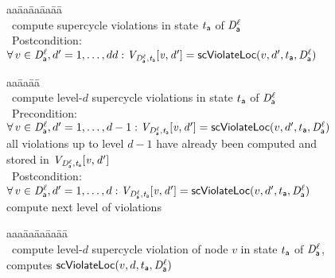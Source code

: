 \begin{figure}[ht]
\setcounter{lctr}{0}
\begin{tabbing}\label{alg:compute-scViol}
aa\= aa\= aa\= aa\= aa\=\kill
{}\\
\cmnt\ compute supercycle violations in state $t_{\mathsf{a}}$ of $\mathit{D}_{\mathsf{a}}^{\ell}$\\
\cmnt\ Postcondition: $\forall\, v \in \mathit{D}_{\mathsf{a}}^{\ell}, d' = 1,\ldots,dd: \mathit{V_{\mathit{D}_{\mathsf{a}}^{\ell},t_{\mathsf{a}}} [v,d']} = \mathsf{scViolateLoc}(v,d',t_{\mathsf{a}},\mathit{D}_{\mathsf{a}}^{\ell})$\\
\end{tabbing}

\setcounter{lctr}{0}
\begin{tabbing}\label{alg:compute-scViolDist}
aa\= aa\= aa\= \kill
{}\\
\cmnt\ compute level-$d$ supercycle violations in state $t_{\mathsf{a}}$ of $\mathit{D}_{\mathsf{a}}^{\ell}$\\
\cmnt\ Precondition: $\forall\, v \in \mathit{D}_{\mathsf{a}}^{\ell}, d' = 1,\ldots,d-1: \mathit{V_{\mathit{D}_{\mathsf{a}}^{\ell},t_{\mathsf{a}}} [v,d']} = \mathsf{scViolateLoc}(v,d',t_{\mathsf{a}},\mathit{D}_{\mathsf{a}}^{\ell})$\\
\cmnt \ie all violations up to level $d-1$ have already been computed and stored in $\mathit{V_{\mathit{D}_{\mathsf{a}}^{\ell},t_{\mathsf{a}}} [v,d']}$\\
\cmnt\ Postcondition: $\forall\, v \in \mathit{D}_{\mathsf{a}}^{\ell}, d' = 1,\ldots,d:  \mathit{V_{\mathit{D}_{\mathsf{a}}^{\ell},t_{\mathsf{a}}} [v,d']} = \mathsf{scViolateLoc}(v,d',t_{\mathsf{a}},\mathit{D}_{\mathsf{a}}^{\ell})$\\
\cmnt \ie compute next level of violations\\
\end{tabbing}


\setcounter{lctr}{0}
\begin{tabbing}\label{alg:compute-scViolDist}
aaa\= aa\= aa\= aa\= aa\= \kill
{}\\
\cmnt\ compute level-$d$ supercycle violation of node $v$ in state $t_{\mathsf{a}}$ of $\mathit{D}_{\mathsf{a}}^{\ell}$, \ie computes $\mathsf{scViolateLoc}(v,d,t_{\mathsf{a}},\mathit{D}_{\mathsf{a}}^{\ell})$\\


\end{tabbing}
\end{figure}
